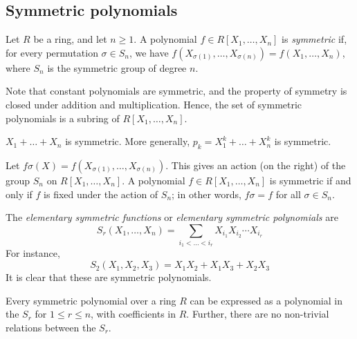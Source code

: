 \subsection{Symmetric polynomials}
\begin{definition}
	Let \( R \) be a ring, and let \( n \geq 1 \).
	A polynomial \( f \in R[X_1, \dots, X_n] \) is \emph{symmetric} if, for every permutation \( \sigma \in S_n \), we have \( f(X_{\sigma(1)}, \dots, X_{\sigma(n)}) = f(X_1, \dots, X_n) \), where \( S_n \) is the symmetric group of degree \( n \).
\end{definition}
Note that constant polynomials are symmetric, and the property of symmetry is closed under addition and multiplication.
Hence, the set of symmetric polynomials is a subring of \( R[X_1, \dots, X_n] \).
\begin{example}
	\( X_1 + \dots + X_n \) is symmetric.
	More generally, \( p_k = X_1^k + \dots + X_n^k \) is symmetric.
\end{example}
\begin{proposition}
	Let \( f \sigma(X) = f(X_{\sigma(1)}, \dots, X_{\sigma(n)}) \).
	This gives an action (on the right) of the group \( S_n \) on \( R[X_1, \dots, X_n] \).
	A polynomial \( f \in R[X_1, \dots, X_n] \) is symmetric if and only if \( f \) is fixed under the action of \( S_n \); in other words, \( f\sigma = f \) for all \( \sigma \in S_n \).
\end{proposition}
\begin{example}
	The \emph{elementary symmetric functions} or \emph{elementary symmetric polynomials} are
	\[ S_r(X_1, \dots, X_n) = \sum_{i_1 < \dots < i_r} X_{i_1} X_{i_2} \cdots X_{i_r} \]
	For instance,
	\[ S_2(X_1, X_2, X_3) = X_1 X_2 + X_1 X_3 + X_2 X_3 \]
	It is clear that these are symmetric polynomials.
\end{example}
\begin{theorem}
	Every symmetric polynomial over a ring \( R \) can be expressed as a polynomial in the \( S_r \) for \( 1 \leq r \leq n \), with coefficients in \( R \).
	Further, there are no non-trivial relations between the \( S_r \).
\end{theorem}
